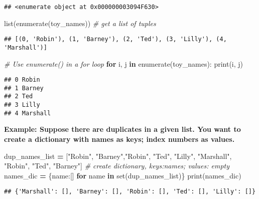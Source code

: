 \documentclass[
]{book}
\newenvironment{Shaded}{\begin{snugshade}}{\end{snugshade}}
\newcommand{\BuiltInTok}[1]{#1}
\newcommand{\CommentTok}[1]{\textcolor[rgb]{0.56,0.35,0.01}{\textit{#1}}}
\newcommand{\ControlFlowTok}[1]{\textcolor[rgb]{0.13,0.29,0.53}{\textbf{#1}}}
\newcommand{\KeywordTok}[1]{\textcolor[rgb]{0.13,0.29,0.53}{\textbf{#1}}}
\newcommand{\NormalTok}[1]{#1}
\newcommand{\OperatorTok}[1]{\textcolor[rgb]{0.81,0.36,0.00}{\textbf{#1}}}
\newcommand{\StringTok}[1]{\textcolor[rgb]{0.31,0.60,0.02}{#1}}
\begin{document}
\begin{verbatim}
## <enumerate object at 0x000000003094F630>
\end{verbatim}

\begin{Shaded}
\begin{Highlighting}[]
\BuiltInTok{list}\NormalTok{(}\BuiltInTok{enumerate}\NormalTok{(toy\_names)) }\CommentTok{\# get a list of tuples}
\end{Highlighting}
\end{Shaded}

\begin{verbatim}
## [(0, 'Robin'), (1, 'Barney'), (2, 'Ted'), (3, 'Lilly'), (4, 'Marshall')]
\end{verbatim}

\begin{Shaded}
\begin{Highlighting}[]
\CommentTok{\# Use enumerate() in a for loop}
\ControlFlowTok{for}\NormalTok{ i, j }\KeywordTok{in} \BuiltInTok{enumerate}\NormalTok{(toy\_names):}
  \BuiltInTok{print}\NormalTok{(i, j)}
\end{Highlighting}
\end{Shaded}

\begin{verbatim}
## 0 Robin
## 1 Barney
## 2 Ted
## 3 Lilly
## 4 Marshall
\end{verbatim}

\textbf{Example: Suppose there are duplicates in a given list. You want to create a dictionary with names as keys; index numbers as values.}

\begin{Shaded}
\begin{Highlighting}[]
\NormalTok{dup\_names\_list }\OperatorTok{=}\NormalTok{ [}\StringTok{"Robin"}\NormalTok{, }\StringTok{"Barney"}\NormalTok{,}\StringTok{"Robin"}\NormalTok{, }\StringTok{"Ted"}\NormalTok{, }\StringTok{"Lilly"}\NormalTok{, }\StringTok{"Marshall"}\NormalTok{, }\StringTok{"Robin"}\NormalTok{, }\StringTok{"Ted"}\NormalTok{, }\StringTok{"Barney"}\NormalTok{]}
\CommentTok{\# create dictionary, keys:names; values: empty}
\NormalTok{names\_dic }\OperatorTok{=}\NormalTok{ \{name:[] }\ControlFlowTok{for}\NormalTok{ name }\KeywordTok{in} \BuiltInTok{set}\NormalTok{(dup\_names\_list)\}}
\BuiltInTok{print}\NormalTok{(names\_dic)}
\end{Highlighting}
\end{Shaded}

\begin{verbatim}
## {'Marshall': [], 'Barney': [], 'Robin': [], 'Ted': [], 'Lilly': []}
\end{verbatim}
\end{document}
